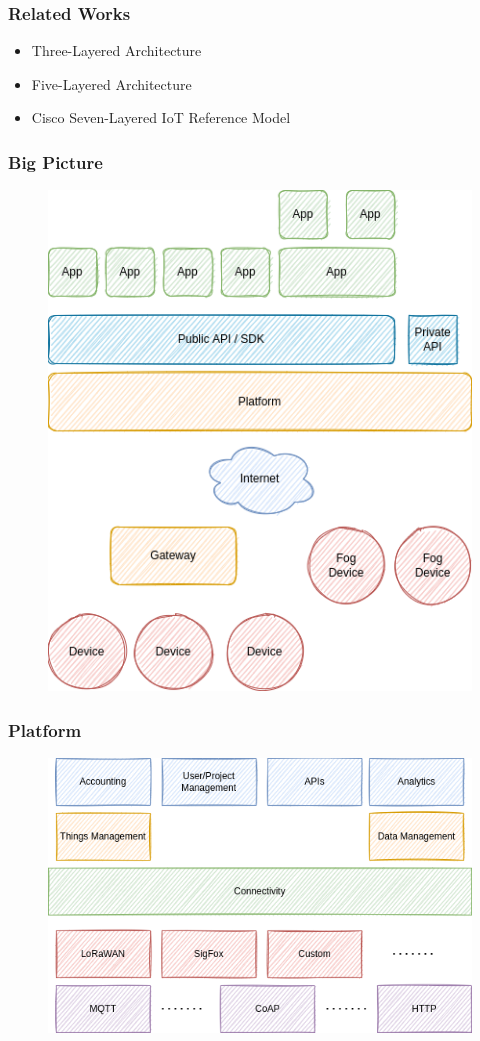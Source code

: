 \documentclass{../iot-lecture}
\begin{document}
\begin{frame}
  \frametitle{Related Works}
  \begin{itemize}
    \item Three-Layered Architecture
    \item Five-Layered Architecture
    \item Cisco Seven-Layered IoT Reference Model
  \end{itemize}
\end{frame}

\begin{frame}
  \frametitle{Big Picture}
  \begin{figure}
    \includegraphics[height=.8\textheight]{./img/big-picture.png}
  \end{figure}
\end{frame}

\begin{frame}
  \frametitle{Platform}
  \begin{figure}
    \includegraphics[width=\textwidth]{./img/platform.png}
  \end{figure}
\end{frame}
\end{document}
